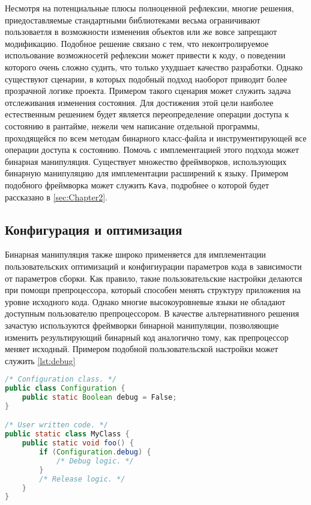Несмотря на потенциальные плюсы полноценной рефлексии, многие решения, приедоставляемые стандартными библиотеками весьма ограничивают пользоваетля в возможности изменения объектов или же вовсе запрещают модификацию. Подобное решение связано с тем, что неконтролируемое испольование возможносетй рефлексии может привести к коду, о поведении которого очень сложно судить, что только ухудшает качество разработки. Однако существуют сценарии, в которых подобный подход наоборот приводит более прозрачной логике проекта. Примером такого сценария может служить задача отслеживания изменения состояния. Для достижения этой цели наиболее естественным решением будет является переопределение операции доступа к состоянию в рантайме, нежели чем написание отдельной программы, проходящейся по всем методам бинарного класс-файла и инструментирующей все операции доступа к состоянию. Помочь с имплементацией этого подхода может бинарная манипуляция. Существует множество фреймворков, использующих бинарную манипуляцию для имплементации расширений к языку. Примером подобного фреймворка может служить \texttt{Kava}, подробнее о которой будет рассказано в \autoref{sec:Chapter2}.

\subsection{Конфигурация и оптимизация}

Бинарная манипуляция также широко применяется для имплементации пользовательских оптимизаций и конфигиурации параметров кода в зависимости от параметров сборки. Как правило, такие пользовательские настройки делаются при помощи препроцессора, который способен менять структуру приложения на уровне исходного кода. Однако многие высокоуровневые языки не обладают доступным пользователю препроцессором. В качестве альтернативного решения зачастую используются фреймворки бинарной манипуляции, позволяющие изменить результирующий бинарный код аналогично тому, как препроцессор меняет исходный. Примером подобной пользовательской настройки может служить \autoref{lst:debug}

\begin{lstlisting}[language=Java, caption=Пример использования класса с конфигурацией проекта, label=lst:debug]
/* Configuration class. */
public class Configuration {
    public static Boolean debug = False;
}

/* User written code. */
public static class MyClass {
    public static void foo() {
        if (Configuration.debug) {
            /* Debug logic. */
        }
        /* Release logic. */
    }
}
\end{lstlisting}

